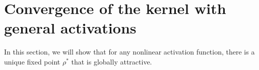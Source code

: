 \documentclass[twoside]{article}
\newcommand{\E}{\mathbb{E}\,}
\theoremstyle{definition}
\newcommand{\thomas}[1]{{\color{blue}\textit{#1}}}
\begin{document}





\section{Convergence of the kernel with general activations}
In this section, we will show that for any nonlinear activation function, there is a unique fixed point $\rho^*$ that is globally attractive.
\end{document}
